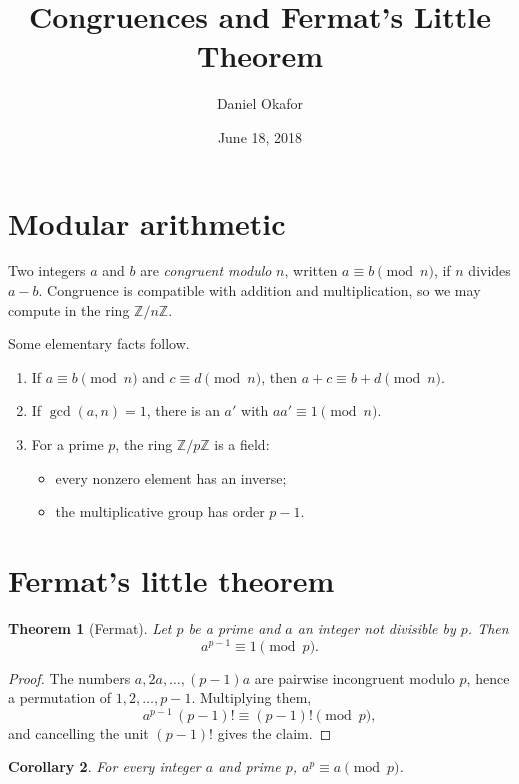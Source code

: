 \documentclass[10pt,letterpaper]{article}
\title{Congruences and Fermat's Little Theorem}
\author{Daniel Okafor}
\date{June 18, 2018}
\newtheorem{theorem}{Theorem}[section]
\newtheorem{corollary}[theorem]{Corollary}
\theoremstyle{remark}
\newcommand{\Z}{\mathbb{Z}}
\begin{document}
\maketitle

\section{Modular arithmetic}
Two integers $a$ and $b$ are \emph{congruent modulo} $n$, written $a\equiv b\pmod n$, if $n$ divides $a-b$. Congruence is compatible with addition and multiplication, so we may compute in the ring $\Z/n\Z$.

Some elementary facts follow.
\begin{enumerate}
  \item If $a\equiv b \pmod n$ and $c\equiv d\pmod n$, then $a+c\equiv b+d\pmod n$.
  \item If $\gcd(a,n)=1$, there is an $a'$ with $aa'\equiv1\pmod n$.
  \item For a prime $p$, the ring $\Z/p\Z$ is a field:
    \begin{itemize}
      \item every nonzero element has an inverse;
      \item the multiplicative group has order $p-1$.
    \end{itemize}
\end{enumerate}

\section{Fermat's little theorem}
\begin{theorem}[Fermat]\label{thm:fermat}
Let $p$ be a prime and $a$ an integer not divisible by $p$. Then
\begin{equation}
  a^{p-1}\equiv 1 \pmod p. \tag{F}
\end{equation}
\end{theorem}

\begin{proof}
The numbers $a, 2a, \dots, (p-1)a$ are pairwise incongruent modulo $p$, hence a permutation of $1,2,\dots,p-1$. Multiplying them,
\[
  a^{p-1}\,(p-1)! \equiv (p-1)! \pmod p,
\]
and cancelling the unit $(p-1)!$ gives the claim.
\end{proof}

\begin{corollary}
For every integer $a$ and prime $p$, $a^p\equiv a\pmod p$.
\end{corollary}
\end{document}
